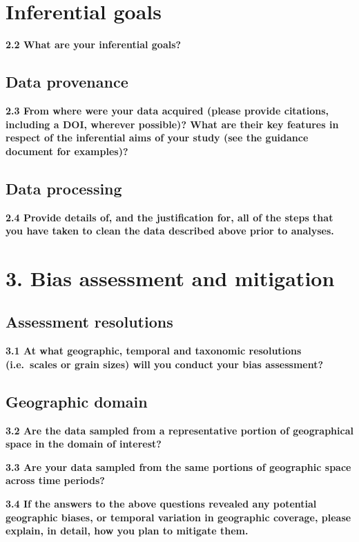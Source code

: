 \documentclass[]{article}
\begin{document}
\section{Inferential goals}\label{inferential-goals}

\textbf{2.2 What are your inferential goals?}

\subsection{Data provenance}\label{data-provenance}

\textbf{2.3 From where were your data acquired (please provide
citations, including a DOI, wherever possible)? What are their key
features in respect of the inferential aims of your study (see the
guidance document for examples)?}

\subsection{Data processing}\label{data-processing}

\textbf{2.4 Provide details of, and the justification for, all of the
steps that you have taken to clean the data described above prior to
analyses.}

\section{3. Bias assessment and
mitigation}\label{bias-assessment-and-mitigation}

\subsection{Assessment resolutions}\label{assessment-resolutions}

\textbf{3.1 At what geographic, temporal and taxonomic resolutions
(i.e.~scales or grain sizes) will you conduct your bias assessment?}

\subsection{Geographic domain}\label{geographic-domain}

\textbf{3.2 Are the data sampled from a representative portion of
geographical space in the domain of interest?}

\textbf{3.3 Are your data sampled from the same portions of geographic
space across time periods?}

\textbf{3.4 If the answers to the above questions revealed any potential
geographic biases, or temporal variation in geographic coverage, please
explain, in detail, how you plan to mitigate them.}
\end{document}
